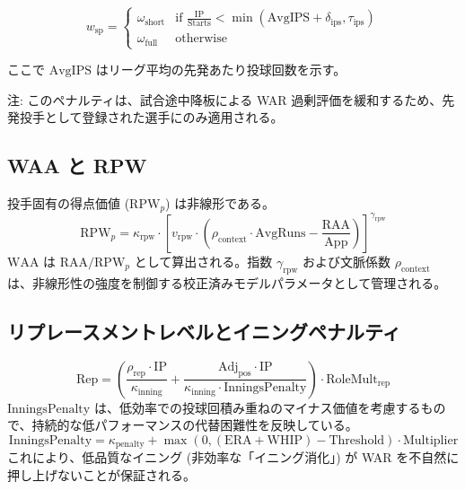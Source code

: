 \documentclass[uplatex,a4paper,11pt,dvipdfmx]{jsarticle}
\newcommand{\mvar}[1]{\mathrm{#1}}
\begin{document}
\begin{equation}
w_{\text{sp}} = \begin{cases}
\omega_{\text{short}} & \text{if } \frac{\mvar{IP}}{\mvar{Starts}} < \min(\mvar{AvgIPS} + \delta_{\text{ips}}, \tau_{\text{ips}}) \\
\omega_{\text{full}} & \text{otherwise}
\end{cases}
\end{equation}

ここで $\mvar{AvgIPS}$ はリーグ平均の先発あたり投球回数を示す。

\noindent 注: このペナルティは、試合途中降板による WAR 過剰評価を緩和するため、先発投手として登録された選手にのみ適用される。

\subsection{WAA と RPW}
投手固有の得点価値 ($\mvar{RPW}_{p}$) は非線形である。
\begin{equation}
\mvar{RPW}_{p} = \kappa_{\text{rpw}} \cdot \left[ v_{\text{rpw}} \cdot \left( \rho_{\text{context}} \cdot \mvar{AvgRuns} - \frac{\mvar{RAA}}{\mvar{App}} \right) \right]^{\gamma_{\text{rpw}}}
\end{equation}
$\mvar{WAA}$ は $\mvar{RAA} / \mvar{RPW}_{p}$ として算出される。指数 $\gamma_{\text{rpw}}$ および文脈係数 $\rho_{\text{context}}$ は、非線形性の強度を制御する校正済みモデルパラメータとして管理される。

\subsection{リプレースメントレベルとイニングペナルティ}
\begin{equation}
\mvar{Rep} = \left( \frac{\rho_{\text{rep}} \cdot \mvar{IP}}{\kappa_{\text{inning}}} + \frac{\mvar{Adj}_{\text{pos}} \cdot \mvar{IP}}{\kappa_{\text{inning}} \cdot \mvar{InningsPenalty}} \right) \cdot \mvar{RoleMult}_{\text{rep}}
\end{equation}
$\mvar{InningsPenalty}$ は、低効率での投球回積み重ねのマイナス価値を考慮するもので、持続的な低パフォーマンスの代替困難性を反映している。
\begin{equation}
\mvar{InningsPenalty} = \kappa_{\text{penalty}} + \max(0, (\mvar{ERA}+\mvar{WHIP}) - \mvar{Threshold}) \cdot \mvar{Multiplier}
\end{equation}
これにより、低品質なイニング (非効率な「イニング消化」) が WAR を不自然に押し上げないことが保証される。
\end{document}
